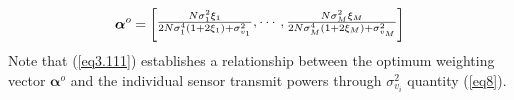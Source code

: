 \documentclass[conference]{IEEEtran}
\begin{document}
\begin{equation}\label{eq3.111}
\boldsymbol \alpha^o\hspace{-0.01cm}=\hspace{-0.01cm}\left[\hspace{-0.01cm}
       \begin{matrix}
         \frac{N \sigma_1^{2} \xi_1}{2N\sigma_1^{4}\left(1+2\xi_1\right)+\sigma^{2}_{v_1}}, 
\cdots, 
\frac{N \sigma_M^{2} \xi_M}{2N\sigma_M^{4}\left(1+2\xi_M\right)+\sigma^{2}_{v_M}}\vspace{0.09cm} 
        \end{matrix}
    \hspace{-0.01cm}\right]
\end{equation}
Note that (\ref{eq3.111}) establishes a relationship between the optimum weighting vector $\boldsymbol \alpha^o$ and the individual sensor transmit powers through  $\sigma^{2}_{v_i}$ quantity (\ref{eq8}). 
\end{document}
